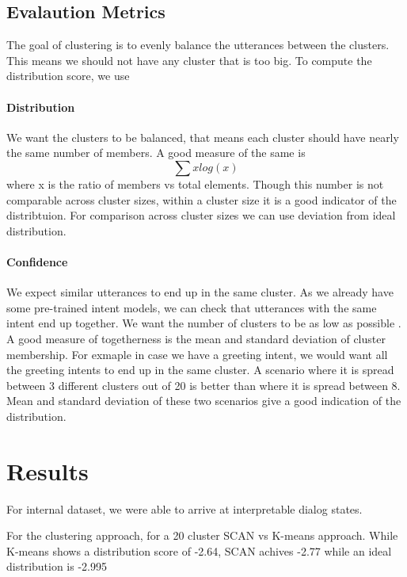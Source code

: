 \documentclass{article}
\begin{document}
\subsection{Evalaution Metrics}
The goal of clustering is to evenly balance the utterances between the clusters. This means we should not have any cluster that is too big. To compute the distribution score, we use


\paragraph{Distribution}
We want the clusters to be balanced, that means each cluster should have nearly the same number of members. A good measure of the same is 
\begin{equation}
    \sum xlog(x)
\end{equation}
where x is the ratio of members vs total elements. Though this number is not comparable across cluster sizes, within a cluster size it is a good indicator of the distribtuion. For comparison across cluster sizes we can use deviation from ideal distribution.

\paragraph{Confidence}
We expect similar utterances to end up in the same cluster. As we already have some pre-trained intent models, we can check that utterances with the same intent end up together. We want the number of clusters to be as low as possible . A good measure of togetherness is the mean and standard deviation of cluster membership. For exmaple in case we have a greeting intent, we would want all the greeting intents to end up in the same cluster. A scenario where it is spread between 3 different clusters out of 20 is better than where it is spread between 8. Mean and standard deviation of these two scenarios give a good indication of the distribution.



\section{Results}
For internal dataset, we were able to arrive at interpretable dialog states.

For the clustering approach, for a 20 cluster SCAN vs K-means approach. While K-means shows a distribution score of -2.64, SCAN achives -2.77 while an ideal distribution is -2.995
\end{document}
